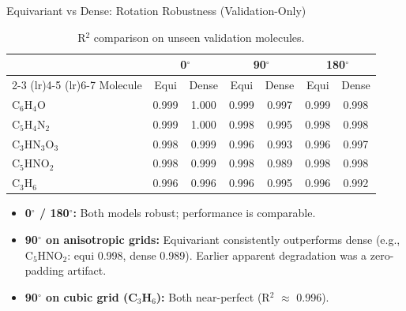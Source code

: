 \documentclass[aspectratio=169]{beamer}
\begin{document}
\begin{frame}{Equivariant vs Dense: Rotation Robustness (Validation-Only)}
  \scriptsize
  \begin{table}[h]
    \centering
    \caption{R$^2$ comparison on unseen validation molecules.}
    \begin{tabular}{lcccccc}
    \toprule
    & \multicolumn{2}{c}{0$^\circ$} & \multicolumn{2}{c}{90$^\circ$} & \multicolumn{2}{c}{180$^\circ$} \\
    \cmidrule(lr){2-3} \cmidrule(lr){4-5} \cmidrule(lr){6-7}
    Molecule & Equi & Dense & Equi & Dense & Equi & Dense \\
    \midrule
    C$_6$H$_4$O      & 0.999 & 1.000 & 0.999 & 0.997 & 0.999 & 0.998 \\
    C$_5$H$_4$N$_2$  & 0.999 & 1.000 & 0.998 & 0.995 & 0.998 & 0.998 \\
    C$_3$HN$_3$O$_3$ & 0.998 & 0.999 & 0.996 & 0.993 & 0.996 & 0.997 \\
    C$_5$HNO$_2$     & 0.998 & 0.999 & 0.998 & 0.989 & 0.998 & 0.998 \\
    C$_3$H$_6$       & 0.996 & 0.996 & 0.996 & 0.995 & 0.996 & 0.992 \\
    \bottomrule
    \end{tabular}
  \end{table}

  \begin{itemize}
      \tiny
      \item \textbf{0$^\circ$ / 180$^\circ$:} Both models robust; performance is comparable.
      \item \textbf{90$^\circ$ on anisotropic grids:} Equivariant consistently outperforms dense (e.g., C$_5$HNO$_2$: equi 0.998, dense 0.989). Earlier apparent degradation was a zero-padding artifact.
      \item \textbf{90$^\circ$ on cubic grid (C$_3$H$_6$):} Both near-perfect (R$^2$ $\approx$ 0.996).
  \end{itemize}
\end{frame}
\end{document}
